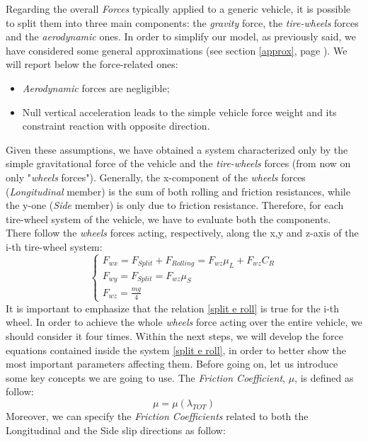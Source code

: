 Regarding the overall \textit{Forces} typically applied to a generic vehicle, it is possible to split them into three main components: the \textit{gravity} force, the \textit{tire-wheels} forces and the \textit{aerodynamic} ones. In order to simplify our model, as previously said, we have considered some general approximations (see section \ref{approx}, page \pageref{approx}). We will report below the force-related ones:
\begin{itemize}
	\item \textit{Aerodynamic} forces are negligible;
	\item Null vertical acceleration leads to the simple vehicle force weight and its constraint reaction with opposite direction. 
\end{itemize}
Given these assumptions, we have obtained a system characterized only by the simple gravitational force of the vehicle and the \textit{tire-wheels} forces (from now on only "\textit{wheels} forces"). Generally, the x-component of the \textit{wheels} forces (\textit{Longitudinal} member) is the sum of both rolling and friction resistances, while the y-one (\textit{Side} member) is only due to friction resistance. 
Therefore, for each tire-wheel system of the vehicle, we have to evaluate both the components. \\
There follow the \textit{wheels} forces acting, respectively, along the x,y and z-axis of the i-th tire-wheel system:
\begin{equation} \label{split e roll}
\begin{cases}
F_{wx} = F_{Split} + F_{Rolling} = F_{wz} \mu_{L} + F_{wz} C_{R} \\
F_{wy} = F_{Split} = F_{wz} \mu_{S} \\
F_{wz} = \frac{mg}{4}
\end{cases}
\end{equation}
It is important to emphasize that the relation \ref{split e roll} is true for the i-th wheel. In order to achieve the whole \textit{wheels} force acting over the entire vehicle, we should consider it four times. Within the next steps, we will develop the force equations contained inside the system \ref{split e roll}, in order to better show the most important parameters affecting them.
\newpage
Before going on, let us introduce some key concepts we are going to use. The \textit{Friction Coefficient}, $ \mu $, is defined as follow:
\begin{equation}
\mu = \mu(\lambda_{TOT})
\end{equation}
Moreover, we can specify the \textit{Friction Coefficients} related to both the Longitudinal and the Side slip directions as follow:
